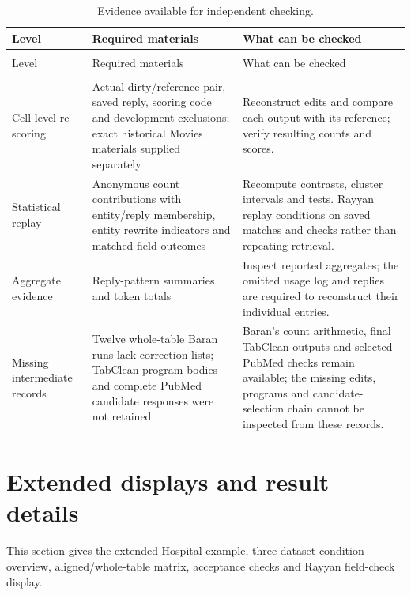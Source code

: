\documentclass[10pt,a4paper]{article}
\renewcommand{\thetable}{S\arabic{table}}
\begin{document}
\begingroup\setlength{\tabcolsep}{3pt}\small
\begin{longtable}{@{}>{\raggedright\arraybackslash}p{}>{\raggedright\arraybackslash}p{}>{\raggedright\arraybackslash}p{}@{}}
\caption{Evidence available for independent checking.}\label{report-table-5-2}\\
\toprule
Level & Required materials & What can be checked \\
\midrule
\endfirsthead
\multicolumn{3}{l}{\small Table \thetable\ (continued)}\\
\toprule
Level & Required materials & What can be checked \\
\midrule
\endhead
\midrule\multicolumn{3}{r}{\footnotesize Continued on next page}\\\endfoot
\bottomrule\endlastfoot
Cell-level re-scoring & Actual dirty/reference pair, saved reply, scoring code and development exclusions; exact historical Movies materials supplied separately & Reconstruct edits and compare each output with its reference; verify resulting counts and scores. \\
Statistical replay & Anonymous count contributions with entity/reply membership, entity rewrite indicators and matched-field outcomes & Recompute contrasts, cluster intervals and tests. Rayyan replay conditions on saved matches and checks rather than repeating retrieval. \\
Aggregate evidence & Reply-pattern summaries and token totals & Inspect reported aggregates; the omitted usage log and replies are required to reconstruct their individual entries. \\
Missing intermediate records & Twelve whole-table Baran runs lack correction lists; TabClean program bodies and complete PubMed candidate responses were not retained & Baran's count arithmetic, final TabClean outputs and selected PubMed checks remain available; the missing edits, programs and candidate-selection chain cannot be inspected from these records. \\
\end{longtable}\endgroup
\clearpage
\section{Extended displays and result details}
\hypertarget{companion-6}{}\label{report-6}

This section gives the extended Hospital example, three-dataset condition overview,
aligned/whole-table matrix, acceptance checks and Rayyan field-check display.
\end{document}
